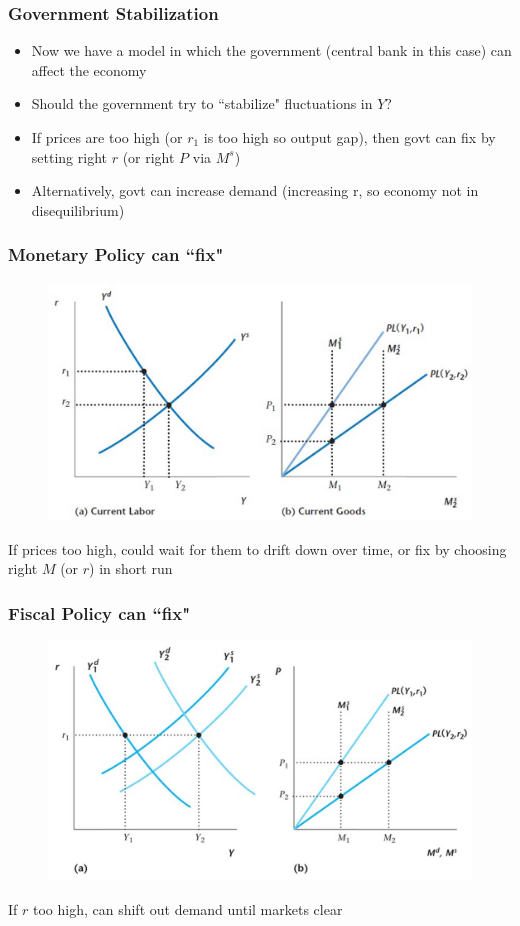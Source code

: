 \documentclass{beamer}
\begin{document}
\begin{frame}
\frametitle[alignment=center]{Government Stabilization}
\begin{itemize}
\item Now we have a model in which the government (central bank in this case) can affect the economy
\bigskip
\item Should the government try to ``stabilize" fluctuations in $Y$?
\bigskip
\item If prices are too high (or $r_1$ is too high so output gap), then govt can fix by setting right $r$ (or right $P$ via $M^s$)
\bigskip
\item Alternatively, govt can increase demand (increasing r, so economy not in disequilibrium)
\end{itemize}
\end{frame}

\begin{frame}
\frametitle[alignment=center]{Monetary Policy can ``fix" }
\begin{figure}
\centering
\includegraphics[scale=0.65]{Figures/W_Fig_14pt3.png}
\end{figure}
If prices too high, could wait for them to drift down over time, or fix by choosing right $M$ (or $r$) in short run
\end{frame}


\begin{frame}
\frametitle[alignment=center]{Fiscal Policy can ``fix" }
\begin{figure}
\centering
\includegraphics[scale=0.65]{Figures/W_Fig_14pt4.png}
\end{figure}
If $r$ too high, can shift out demand until markets clear
\end{frame}
\end{document}
